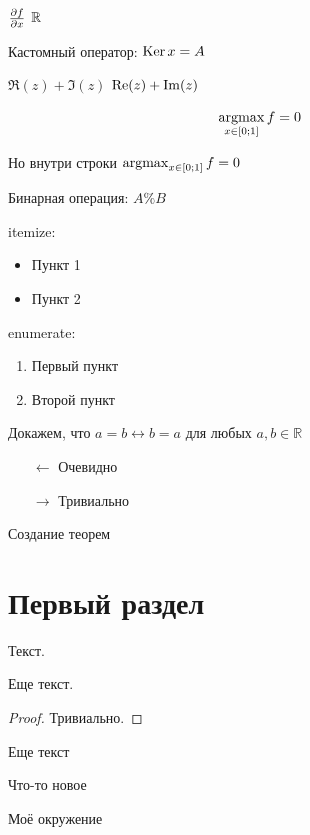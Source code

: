     $\frac{\partial f}{\partial x}$
    $\mathbb R$

    Кастомный оператор: $\operatorname{Ker} x = A$

    $\Re (z) + \Im(z)$ \hspace{10pt}   $\operatorname{Re}(z) + \operatorname{Im}(z)$

    \[ \operatorname*{argmax}_{x \in [0;1]} f = 0 \]

    Но внутри строки $\operatorname*{argmax}_{x \in [0;1]} f = 0$

    Бинарная операция: $A \percent B$

    itemize:
    \begin{itemize}
        \item Пункт 1
        \item Пункт 2
    \end{itemize}

    enumerate:
    \begin{enumerate}
    	\item Первый пункт
    	\item Второй пункт
    \end{enumerate}

    Докажем, что $ a = b \leftrightarrow b = a $ для любых $a,b \in \mathbb{R}$
    \begin{itemize}
    	\item[$\leftarrow$] Очевидно
    	\item[$\rightarrow$] Тривиально
    \end{itemize}

    Создание теорем

    \section{Первый раздел}

    \begin{theorem}Текст.\end{theorem}
    \begin{theorem}Еще текст.\end{theorem}
    \begin{proof}Тривиально.\end{proof}
    \begin{corollary}Еще текст\end{corollary}
    \begin{definition}Что-то новое\end{definition}

    \begin{myenv}
    	Моё окружение
    \end{myenv}

